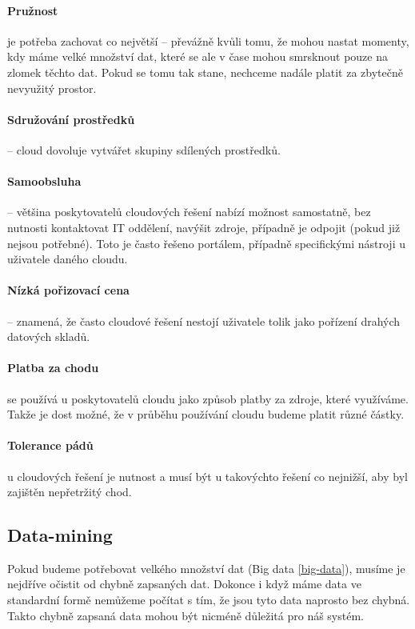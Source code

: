\paragraph{Pružnost} je potřeba zachovat co největší -- převážně kvůli tomu, že mohou nastat momenty, kdy máme velké množství dat, které se ale v čase mohou smrsknout pouze na zlomek těchto dat. Pokud se tomu tak stane, nechceme nadále platit za zbytečně nevyužitý prostor. \cite{big-data-dummies}

\paragraph{Sdružování prostředků} -- cloud dovoluje vytvářet skupiny sdílených prostředků. \cite{big-data-dummies}

\paragraph{Samoobsluha} -- většina poskytovatelů cloudových řešení nabízí možnost samostatně, bez nutnosti kontaktovat IT oddělení, navýšit zdroje, případně je odpojit (pokud již nejsou potřebné). Toto je často řešeno portálem, případně specifickými nástroji u uživatele daného cloudu. \cite{big-data-dummies}

\paragraph{Nízká pořizovací cena} -- znamená, že často cloudové řešení nestojí uživatele tolik jako pořízení drahých datových skladů. \cite{big-data-dummies}

\paragraph{Platba za chodu} se používá u poskytovatelů cloudu jako způsob platby za zdroje, které využíváme. Takže je dost možné, že v průběhu používání cloudu budeme platit různé částky. \cite{big-data-dummies}

\paragraph{Tolerance pádů} u cloudových řešení je nutnost a musí být u takovýchto řešení co nejnižší, aby byl zajištěn nepřetržitý chod. \cite{big-data-dummies}

\subsection{Data-mining} \label{data-mining}
\par Pokud budeme potřebovat velkého množství dat (Big data \ref{big-data}), musíme je nejdříve očistit od chybně zapsaných dat. Dokonce i když máme data ve standardní formě nemůžeme počítat s tím, že jsou tyto data naprosto bez chybná. Takto chybně zapsaná data mohou být nicméně důležitá pro náš systém.\cite{data-mining-principles}

